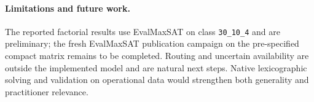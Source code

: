 \paragraph{Limitations and future work.}
The reported factorial results use EvalMaxSAT on class \texttt{30\_10\_4} and
are preliminary; the fresh EvalMaxSAT publication campaign on the pre-specified
compact matrix remains to be completed.  Routing and uncertain availability are outside the
implemented model and are natural next steps.  Native lexicographic solving and
validation on operational data would strengthen both generality and practitioner
relevance.


